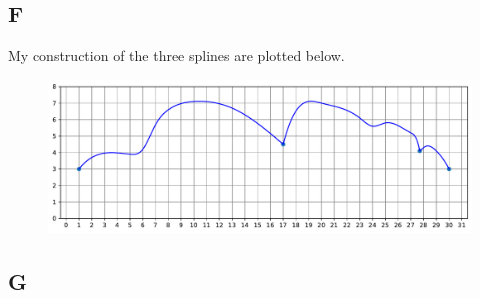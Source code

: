 \documentclass[12pt]{article}
\begin{document}
    \subsection{F}

        My construction of the three splines are plotted below.
        \begin{figure}[H]
            \centering
            \includegraphics[scale=0.64]{pics/F}
        \end{figure}

    \subsection{G}
        
\end{document}
